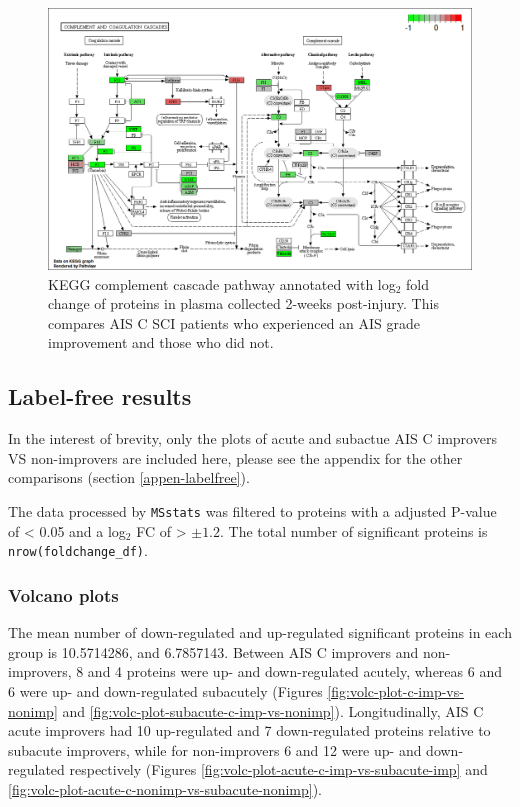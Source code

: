 \documentclass[
]{article}
\begin{document}
\begin{figure}

{\centering \includegraphics[width=18.31in]{figures/kegg_pathways/hsa04610_pathview} 

}

\caption{KEGG complement cascade pathway annotated with log\(_2\) fold change of proteins in plasma collected 2-weeks post-injury. This compares AIS C SCI patients who experienced an AIS grade improvement and those who did not.}\label{fig:kegg-complement}
\end{figure}

\clearpage

\hypertarget{chap-4-results}{%
\subsection{Label-free results}\label{chap-4-results}}

In the interest of brevity, only the plots of acute and subactue AIS C improvers VS non-improvers are included here, please see the appendix for the other comparisons (section \ref{appen-labelfree}).

The data processed by \texttt{MSstats} was filtered to proteins with a adjusted P-value of \textless{} 0.05 and a log\(_2\) FC of \textgreater{} \(\pm1.2\).
The total number of significant proteins is \texttt{nrow(foldchange\_df)}.

\hypertarget{volcano-plots}{%
\subsubsection{Volcano plots}\label{volcano-plots}}

The mean number of down-regulated and up-regulated significant proteins in each group is 10.5714286, and 6.7857143.
Between AIS C improvers and non-improvers, 8 and 4 proteins were up- and down-regulated acutely, whereas 6 and 6 were up- and down-regulated subacutely (Figures \ref{fig:volc-plot-c-imp-vs-nonimp} and \ref{fig:volc-plot-subacute-c-imp-vs-nonimp}).
Longitudinally, AIS C acute improvers had 10 up-regulated and 7 down-regulated proteins relative to subacute improvers, while for non-improvers 6 and 12 were up- and down-regulated respectively (Figures \ref{fig:volc-plot-acute-c-imp-vs-subacute-imp} and \ref{fig:volc-plot-acute-c-nonimp-vs-subacute-nonimp}).
\end{document}
